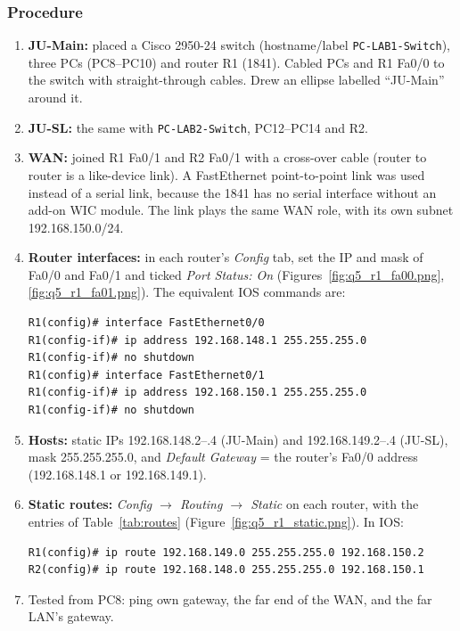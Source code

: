 \documentclass[11pt]{article}
\begin{document}
\subsubsection*{Procedure}
\begin{enumerate}[leftmargin=1.8em]
  \item \textbf{JU-Main:} placed a Cisco 2950-24 switch (hostname/label
  \texttt{PC-LAB1-Switch}), three PCs (PC8--PC10) and router R1 (1841). Cabled PCs and R1
  Fa0/0 to the switch with straight-through cables. Drew an ellipse labelled ``JU-Main''
  around it.
  \item \textbf{JU-SL:} the same with \texttt{PC-LAB2-Switch}, PC12--PC14 and R2.
  \item \textbf{WAN:} joined R1 Fa0/1 and R2 Fa0/1 with a cross-over cable (router to
  router is a like-device link). A FastEthernet point-to-point link was used instead of a
  serial link, because the 1841 has no serial interface without an add-on WIC module. The
  link plays the same WAN role, with its own subnet 192.168.150.0/24.
  \item \textbf{Router interfaces:} in each router's \emph{Config} tab, set the IP and mask
  of Fa0/0 and Fa0/1 and ticked \emph{Port Status: On} (Figures~\ref{fig:q5_r1_fa00.png},
  \ref{fig:q5_r1_fa01.png}). The equivalent IOS commands are:
\begin{lstlisting}
R1(config)# interface FastEthernet0/0
R1(config-if)# ip address 192.168.148.1 255.255.255.0
R1(config-if)# no shutdown
R1(config)# interface FastEthernet0/1
R1(config-if)# ip address 192.168.150.1 255.255.255.0
R1(config-if)# no shutdown
\end{lstlisting}
  \item \textbf{Hosts:} static IPs 192.168.148.2--.4 (JU-Main) and 192.168.149.2--.4
  (JU-SL), mask 255.255.255.0, and
  \emph{Default Gateway} = the router's Fa0/0 address (192.168.148.1 or 192.168.149.1).
  \item \textbf{Static routes:} \emph{Config $\to$ Routing $\to$ Static} on each router,
  with the entries of Table~\ref{tab:routes} (Figure~\ref{fig:q5_r1_static.png}). In IOS:
\begin{lstlisting}
R1(config)# ip route 192.168.149.0 255.255.255.0 192.168.150.2
R2(config)# ip route 192.168.148.0 255.255.255.0 192.168.150.1
\end{lstlisting}
  \item Tested from PC8: ping own gateway, the far end of the WAN, and the far LAN's gateway.
\end{enumerate}
\end{document}
